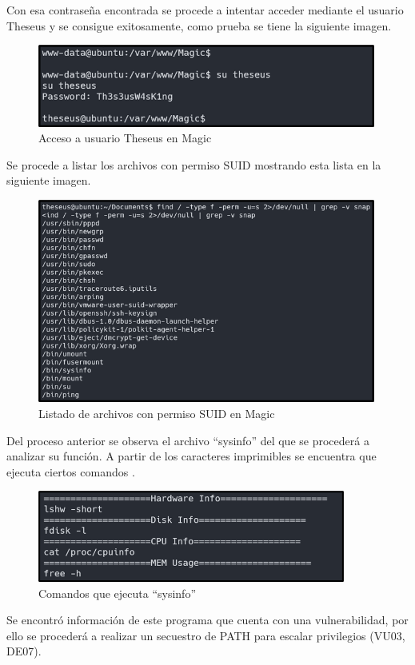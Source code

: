 Con esa contraseña encontrada se procede a intentar acceder mediante el usuario Theseus y se consigue exitosamente, como prueba se tiene la siguiente imagen.
\begin{figure}[H]
    \centering
    \includegraphics[width=0.99\textwidth]{imagenes/acthe.png}
    \caption{Acceso a usuario Theseus en Magic}
\end{figure}
Se procede a listar los archivos con permiso SUID mostrando esta lista en la siguiente imagen.
\begin{figure}[H]
    \centering
    \includegraphics[width=0.99\textwidth]{imagenes/listsuma.png}
    \caption{Listado de archivos con permiso SUID en Magic}
\end{figure}
Del proceso anterior se observa el archivo “sysinfo” del que se procederá a analizar su función. A partir de los caracteres imprimibles se encuentra que ejecuta ciertos comandos .
\begin{figure}[H]
    \centering
    \includegraphics[width=0.9\textwidth]{imagenes/sysin.png}
    \caption{Comandos que ejecuta ``sysinfo''}
\end{figure}
Se encontró información de este programa que cuenta con una vulnerabilidad, por ello se procederá a realizar un secuestro de PATH para escalar privilegios (VU03, DE07).

